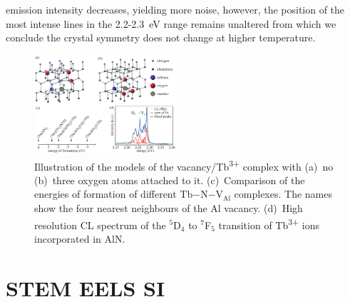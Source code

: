 \documentclass[%
aip,
rsi,%
 amsmath,amssymb,%
 reprint,%
]{revtex4-1}
\begin{document}
emission intensity decreases, yielding more noise, however, the position of the most intense lines in the 2.2-2.3~eV range remains unaltered from which we conclude the crystal symmetry does not change at higher temperature.

\begin{figure}%
	\includegraphics[width=0.47\textwidth]{model}
    \caption{Illustration of the models of the vacancy/Tb\textsuperscript{3+} complex with (a)~no (b)~three oxygen atoms attached to it. (c)~Comparison of the energies of formation of different Tb$-$N$-$V$_\text{Al}$ complexes. The names show the four nearest neighbours of the Al vacancy. (d)~High resolution CL spectrum of the $^5$D$_4$ to $^7$F$_5$ transition of Tb\textsuperscript{3+} ions incorporated in AlN.}
    \label{fig:felix_model}
\end{figure}

\section{STEM EELS SI}
\label{sec:STEMEELSSI}
\end{document}
